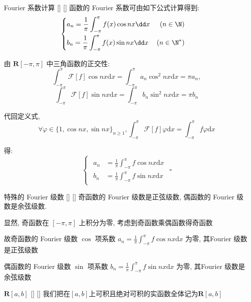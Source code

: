 \documentclass[UTF8]{ctexart}
\begin{document}
			\begin{thm}
			    []
			    {Fourier 系数计算}
			    []
			    []
				函数的 Fourier 系数可由如下公式计算得到: 
				\[
				\begin{cases}
				\begin{aligned}
					&a_n=\frac{1}{\pi}\int_{-\pi}^{\pi}f(x)\cos nx\dd x & (n\in\N)\\
					&b_n=\frac{1}{\pi}\int_{-\pi}^{\pi}f(x)\sin nx\dd x & (n\in\N^*)
				\end{aligned}
				\end{cases}\]
			\end{thm}

            \begin{prf}
				由 \(\mathbf{R}[-\pi,\pi]\) 中三角函数的正交性:
				\[\int_{-\pi}^{\pi}\mathcal{F}[f]\cos nx\text{d}x=\int_{-\pi}^{\pi}a_n\cos^2nx\text{d}x=\pi a_n,\]
				\[\int_{-\pi}^{\pi}\mathcal{F}[f]\sin nx\text{d}x=\int_{-\pi}^{\pi}b_n\sin^2nx\text{d}x=\pi b_n\]

				代回定义式, 
				\[\forall\varphi\in\{1,\cos nx,\sin nx\}_{n\geq 1},\int_{-\pi}^{\pi}\mathcal{F}[f]\varphi\text{d}x=\int_{-\pi}^{\pi}f\varphi\text{d}x\]

				得: 
				\[\begin{cases}
					\begin{aligned}
						a_n&=\frac{1}{\pi}\int_{-\pi}^{\pi}f\cos nx\text{d}x \\
						b_n&=\frac{1}{\pi}\int_{-\pi}^{\pi}f\sin nx\text{d}x
					\end{aligned}
				\end{cases}\square\]
			\end{prf}

			\begin{crl}
			    []
			    {特殊的 Fourier 级数}
			    []
			    []
				奇函数的 Fourier 级数是正弦级数, 偶函数的 Fourier 级数是余弦级数. 
			\end{crl}

            \begin{prf}
				显然, 奇函数在 \([-\pi,\pi]\) 上积分为零, 考虑到奇函数乘偶函数得奇函数

				故奇函数的 Fourier 级数 \(\cos\) 项系数 \(a_n=\frac{1}{\pi}\int_{-\pi}^{\pi}f\cos nx\text{d}x\) 为零, 其Fourier 级数是正弦级数

				偶函数的 Fourier 级数 \(\sin\) 项系数 \(b_n=\frac{1}{\pi}\int_{-\pi}^{\pi}f\sin nx\text{d}x\) 为零, 其Fourier 级数是余弦级数
			\end{prf}

			\begin{dfn}
				[]
			    {\(\mathbf{R}[a,b]\)}
			    []
			    []
				我们把在\([a,b]\)上可积且绝对可积的实函数全体记为\(\mathbf{R}[a,b]\)
			\end{dfn}
\end{document}
